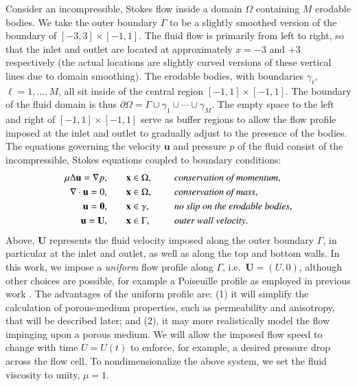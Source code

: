 \documentclass[3p]{elsarticle}
\newcommand{\bd}{{\partial}}
\newcommand{\grad}{{\nabla}}
\newcommand{\uu}{{\mathbf{u}}}
\newcommand{\UU}{{\mathbf{U}}}
\newcommand{\xx}{{\mathbf{x}}}
\def\gap{\hspace*{.2in}}
\begin{document}
Consider an incompressible, Stokes flow inside a domain $\Omega$ containing $M$ erodable bodies. We take the outer boundary $\Gamma$ to be a slightly smoothed version of the boundary of $[-3,3] \times [-1,1]$. The fluid flow is primarily from left to right, so that the inlet and outlet are located at approximately $x=-3$ and $+3$ respectively (the actual locations are slightly curved versions of these vertical lines due to domain smoothing). The erodable bodies, with boundaries $\gamma_\ell$, $\ell = 1,\ldots,M$, all sit inside of the central region $[-1,1] \times [-1,1]$. The boundary of the fluid domain is thus $\bd \Omega = \Gamma \cup \gamma_1 \cup \cdots \cup \gamma_M$. 
The empty space to the left and right of $[-1,1] \times [-1,1]$ serve as buffer regions to allow the flow profile imposed at the inlet and outlet to gradually adjust to the presence of the bodies. The equations governing the velocity $\uu$ and pressure $p$ of the fluid consist of the incompressible, Stokes equations coupled to boundary conditions:
\begin{equation}
\label{eqn:StokesEq}
  \begin{split}
    \mu \Delta \uu = \grad p, &\hspace{20pt} \xx \in \Omega, \gap 
      &&\mbox{\em conservation of momentum}, \\
    \grad \cdot \uu = 0, &\hspace{20pt} \xx \in \Omega, \gap 
      &&\mbox{\em conservation of mass}, \\
    \uu = \mathbf{0}, &\hspace{20pt} \xx \in \gamma, \gap 
      &&\mbox{\em no slip on the erodable bodies}, \\
    \uu = \UU, &\hspace{20pt} \xx \in \Gamma, \gap 
      &&\mbox{\em outer wall velocity}.
  \end{split}
\end{equation}
Above, $\UU$ represents the fluid velocity imposed along the outer boundary $\Gamma$, in particular at the inlet and outlet, as well as along the top and bottom walls. In this work, we impose a {\em uniform} flow profile along $\Gamma$, i.e.~$\UU = (U,0)$, although other choices are possible, for example a Poiseuille profile as employed in previous work \cite{quaife2018boundary, chiu2020viscous}. The advantages of the uniform profile are: (1) it will simplify the calculation of porous-medium properties, such as permeability and anisotropy, that will be described later; and (2), it may more realistically model the flow impinging upon a porous medium. We will allow the imposed flow speed to change with time $U = U(t)$ to enforce, for example, a desired pressure drop across the flow cell. To nondimensionalize the above system, we set the fluid viscosity to unity, $\mu = 1$.
\end{document}
